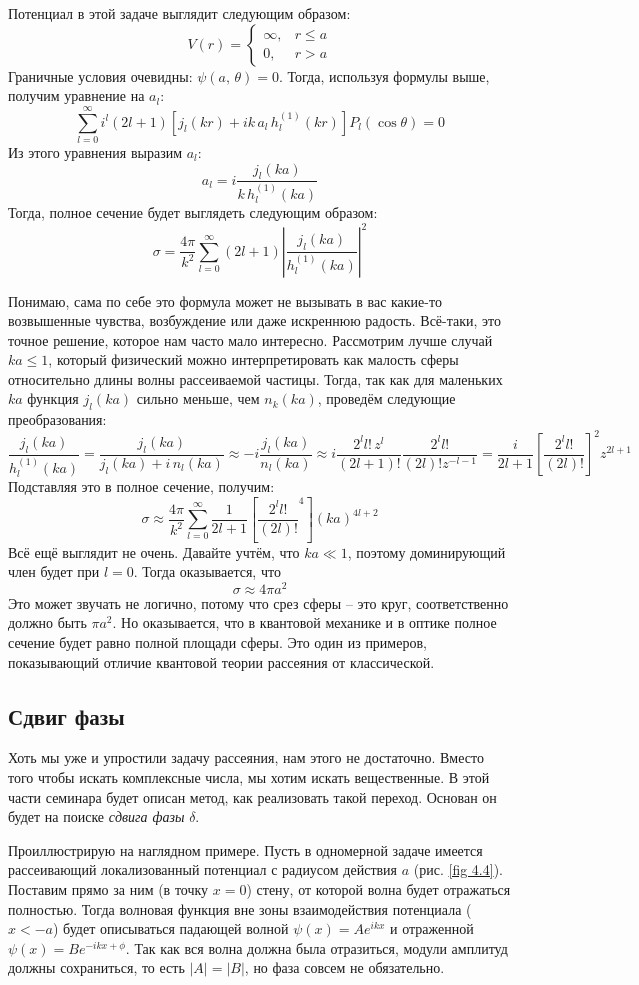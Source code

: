 \exercisebadge
Потенциал в этой задаче выглядит следующим образом:
\[
  V(r) = \begin{cases}\infty, &r\leq a \\ 0, &r>a\end{cases}
\]
Граничные условия очевидны: $\psi(a,\, \theta) = 0$. Тогда, используя формулы
выше, получим уравнение на $a_l$:
\[
  \sum\limits_{l=0}^{\infty}i^{l}(2l+1)\left[j_l(kr) + ik\,a_l \, h^{(1)}_l(kr)\right]P_l(\cos\theta) = 0
\]
Из этого уравнения выразим $a_l$:
\[
  a_l = i\frac{j_l(ka)}{k\,h^{(1)}_l(ka)}
\]
Тогда, полное сечение будет выглядеть следующим образом:
\[
  \sigma = \frac{4\pi}{k^2}\sum\limits_{l=0}^{\infty}(2l+1)\left|\frac{j_l(ka)}{h^{(1)}_l(ka)}\right|^2
\]

Понимаю, сама по себе это формула может не вызывать в вас какие-то возвышенные
чувства, возбуждение или даже искреннюю радость. Всё-таки, это точное решение,
которое нам часто мало интересно. Рассмотрим лучше случай $ka\leq 1$, который
физический можно интерпретировать как малость сферы относительно длины волны
рассеиваемой частицы. Тогда, так как для маленьких $ka$ функция $j_l(ka)$
сильно меньше, чем $n_k(ka)$, проведём следующие преобразования:
\[
  \frac{j_{l}(ka)}{h^{(1)}_{l}(ka)} = \frac{j_{l}(ka)}{j_{l}(ka) + i\,n_l(ka)} \approx -i\frac{j_{l}(ka)}{n_{l}(ka)} \approx i\frac{2^l l!\,z^l}{(2l+1)!}\frac{2^l l!}{(2l)!z^{-l-1}} = \frac{i}{2l+1}\left[\frac{2^l l!}{(2l)!}\right]^2 z^{2l+1}
\]
Подставляя это в полное сечение, получим:
\[
  \sigma \approx \frac{4\pi}{k^2}\sum\limits_{l=0}^{\infty}\frac{1}{2l+1} \left[\frac{2^ll!}{(2l)!}^4\right] (ka)^{4l+2}
\]
Всё ещё выглядит не очень. Давайте учтём, что $ka \ll 1$, поэтому доминирующий
член будет при $l=0$. Тогда оказывается, что
\[
  \sigma \approx 4\pi a^2
\]
Это может звучать не логично, потому что срез сферы -- это круг, соответственно
должно быть $\pi a^2$. Но оказывается, что в квантовой механике и в оптике
полное сечение будет равно полной площади сферы. Это один из примеров,
показывающий отличие квантовой теории рассеяния от классической.
\qedsq
\subsection{Сдвиг фазы}
Хоть мы уже и упростили задачу рассеяния, нам этого не достаточно. Вместо того
чтобы искать комплексные числа, мы хотим искать вещественные. В этой части
семинара будет описан метод, как реализовать такой переход. Основан он будет на
поиске \textit{сдвига фазы} $\delta$.

Проиллюстрирую на наглядном примере. Пусть в одномерной задаче имеется
рассеивающий локализованный потенциал с радиусом действия $a$ (рис. \ref{fig
  4.4}). Поставим прямо за ним (в точку $x=0$) стену, от которой волна будет
отражаться полностью. Тогда волновая функция вне зоны взаимодействия потенциала
($x < -a$) будет описываться падающей волной $\psi(x) = Ae^{ikx}$ и отраженной
$\psi(x) = Be^{-ikx + \phi}$. Так как вся волна должна была отразиться, модули
амплитуд должны сохраниться, то есть $|A| = |B|$, но фаза совсем не
обязательно.

